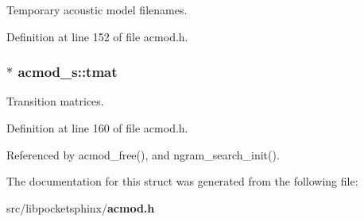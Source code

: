 \-Temporary acoustic model filenames. 



\-Definition at line 152 of file acmod.\-h.

\subsubsection[{tmat}]{$\ast$ {\bf acmod\-\_\-s\-::tmat}}\label{structacmod__s_aaa3982184a49f0d61e397ba89f486259}


\-Transition matrices. 



\-Definition at line 160 of file acmod.\-h.



\-Referenced by acmod\-\_\-free(), and ngram\-\_\-search\-\_\-init().



\-The documentation for this struct was generated from the following file\-:\begin{DoxyCompactItemize}
\item 
src/libpocketsphinx/{\bf acmod.\-h}\end{DoxyCompactItemize}
